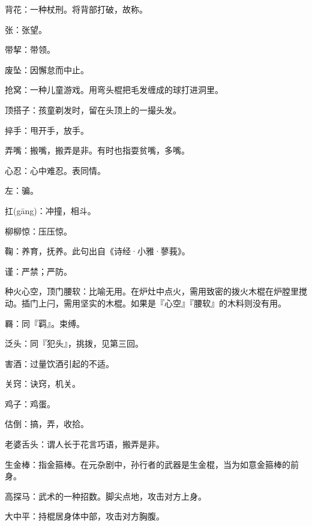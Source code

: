 \startbuffer[1125]
背花：一种杖刑。将背部打破，故称。
\stopbuffer


\startbuffer[1126]
张：张望。
\stopbuffer


\startbuffer[1127]
带挈：带领。
\stopbuffer


\startbuffer[1128]
废坠：因懈怠而中止。
\stopbuffer


\startbuffer[1129]
抢窝：一种儿童游戏。用弯头棍把毛发缠成的球打进洞里。
\stopbuffer


\startbuffer[1130]
顶搭子：孩童剃发时，留在头顶上的一撮头发。
\stopbuffer


\startbuffer[1131]
捽手：甩开手，放手。
\stopbuffer


\startbuffer[1132]
弄嘴：搬嘴，搬弄是非。有时也指耍贫嘴，多嘴。
\stopbuffer


\startbuffer[1133]
心忍：心中难忍。表同情。
\stopbuffer


\startbuffer[1134]
左：骗。
\stopbuffer


\startbuffer[1135]
扛(gāng)：冲撞，相斗。
\stopbuffer


\startbuffer[1136]
柳柳惊：压压惊。
\stopbuffer


\startbuffer[1137]
鞠：养育，抚养。此句出自《诗经·小雅·蓼莪》。
\stopbuffer


\startbuffer[1138]
谨：严禁；严防。
\stopbuffer


\startbuffer[1139]
种火心空，顶门腰软：比喻无用。在炉灶中点火，需用致密的拨火木棍在炉膛里搅动。插门上闩，需用坚实的木棍。如果是『心空』『腰软』的木料则没有用。
\stopbuffer


\startbuffer[1140]
羇：同『羁』。束缚。
\stopbuffer


\startbuffer[1141]
泛头：同『犯头』，挑拨，见第三回。
\stopbuffer


\startbuffer[1142]
害酒：过量饮酒引起的不适。
\stopbuffer


\startbuffer[1143]
关窍：诀窍，机关。
\stopbuffer


\startbuffer[1144]
鸡子：鸡蛋。
\stopbuffer


\startbuffer[1145]
估倒：搞，弄，收拾。
\stopbuffer


\startbuffer[1146]
老婆舌头：谓人长于花言巧语，搬弄是非。
\stopbuffer


\startbuffer[1147]
生金棒：指金箍棒。在元杂剧中，孙行者的武器是生金棍，当为如意金箍棒的前身。
\stopbuffer


\startbuffer[1148]
高探马：武术的一种招数。脚尖点地，攻击对方上身。
\stopbuffer


\startbuffer[1149]
大中平：持棍居身体中部，攻击对方胸腹。
\stopbuffer


